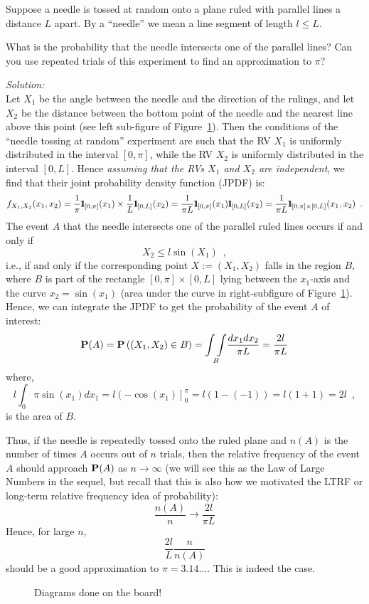 \begin{example}\label{EgBuffonsNeedle}
Suppose a needle is tossed at random onto a plane ruled with parallel lines a distance $L$ apart. 
By a ``needle'' we mean a line segment of length $ l \leq L$.

What is the probability that the needle intersects one of the parallel lines? Can you use repeated trials of this experiment to find an approximation to $\pi$?

{\em Solution:}\\[4pt]
Let $X_1$ be the angle between the needle and the direction of the rulings, and let $X_2$ be the distance between the bottom point of the needle and the nearest line above this point (see left sub-figure of Figure~\ref{F:BuffonsNeedle}). 
Then the conditions of the ``needle tossing at random'' experiment are such that the RV $X_1$ is uniformly distributed in the interval $[0,\pi]$, while the RV $X_2$ is uniformly distributed in the interval $[0,L]$. 
Hence {\em assuming that the RVs $X_1$ and $X_2$ are independent}, we find that their joint probability density function (JPDF) is:
\[
f_{X_1,X_2}(x_1,x_2) = \frac{1}{\pi}\BB{1}_{[0,\pi]}(x_1) \times \frac{1}{L}\BB{1}_{[0,L]}(x_2) = \frac{1}{\pi L} \BB{1}_{[0,\pi]}(x_1) \BB{1}_{[0,L]}(x_2) = \frac{1}{\pi L} \BB{1}_{[0,\pi] \times [0,L] }(x_1,x_2) \enspace . 
\]
The event $A$ that the needle intersects one of the parallel ruled lines occurs if and only if
\[
X_2 \leq l \sin(X_1) \enspace,
\]
i.e., if and only if the corresponding point $X := (X_1,X_2)$ falls in the region $B$, where $B$ is part of the rectangle $[0,\pi] \times [0,L]$ lying between the $x_1$-axis and the curve $x_2=\sin(x_1)$ (area under the curve in right-subfigure of Figure~\ref{F:BuffonsNeedle}). 
Hence, we can integrate the JPDF to get the probability of the event $A$ of interest:
\[
\mathbf{P}(A) = \mathbf{P} \left( (X_1,X_2) \in B \right) = \underset{B}{\int \int} \frac{dx_1 dx_2}{\pi L} = \frac{2l}{\pi L}
\]
where,
\[
l \int_0{\pi} \sin(x_1) dx_1 = l \left( - \cos(x_1)\right]_0^{\pi} = l(1-(-1))=l(1+1)=2l \enspace,
\]
is the area of $B$. 

Thus, if the needle is repeatedly tossed onto the ruled plane and $n(A)$ is the number of times $A$ occurs out of $n$ trials, then the relative frequency of the event $A$ should approach $\mathbf{P}(A)$ as $n \to \infty$ (we will see this as the Law of Large Numbers in the sequel, but recall that this is also how we motivated the LTRF or long-term relative frequency idea of probability):
\[
\frac{n(A)}{n} \to \frac{2l}{\pi L}
\]
Hence, for large $n$,
\[
\frac{2 l}{L}\frac{n}{n(A)}
\]
should be a good approximation to $\pi=3.14\ldots$. This is indeed the case.
\end{example}
\begin{figure}
\vspace{3cm}
\caption{Diagrams done on the board! \label{F:BuffonsNeedle}}
\end{figure}

